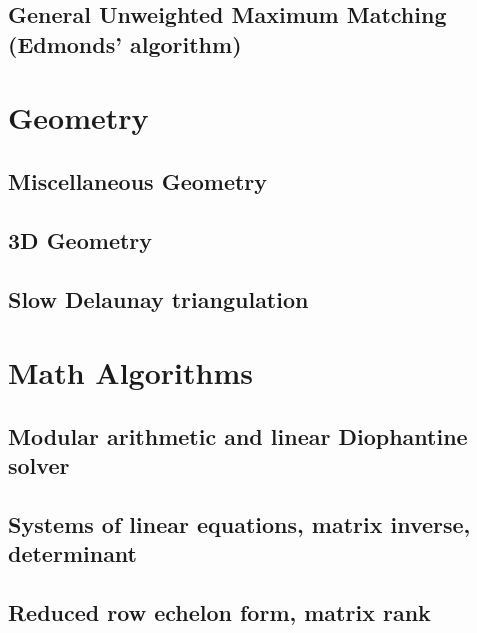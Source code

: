 \documentclass[9pt]{extarticle}
\begin{document}
\begin{multicols}{3}
\subsection{General Unweighted Maximum Matching (Edmonds' algorithm)}


\section{Geometry}

\subsection{Miscellaneous Geometry}


\subsection{3D Geometry}


\subsection{Slow Delaunay triangulation}


\section{Math Algorithms}

\subsection{Modular arithmetic and linear Diophantine solver}


\subsection{Systems of linear equations, matrix inverse, determinant}


\subsection{Reduced row echelon form, matrix rank}



\end{multicols}
\end{document}
